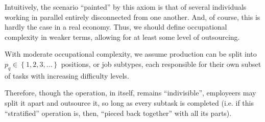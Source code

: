 \documentclass[hidelinks, nonatbib]{elsarticle}
\begin{document}
\begin{axiom}
\begin{subaxiom}
        Intuitively, the scenario ``painted'' by this axiom is that of several individuals working in parallel entirely disconnected from one another. And, of course, this is hardly the case in a real economy. Thus, we should define occupational complexity in weaker terms, allowing for at least some level of outsourcing.
    \end{subaxiom}

    \begin{subaxiom} With moderate occupational complexity, we assume production can be split into $p_q \in \left\{1, 2, 3, \dots\right\}$ positions, or job subtypes, each responsible for their own subset of tasks with increasing difficulty levels.
    
    Therefore, though the operation, in itself, remains ``indivisible'', employeers may split it apart and outsource it, so long as every subtask is completed (i.e. if this ``stratified'' operation is, then, ``pieced back together'' with all its parts).


\end{subaxiom}
\end{axiom}
\end{document}

